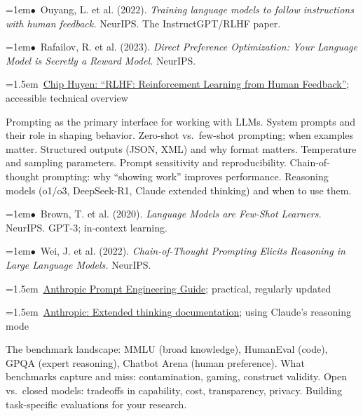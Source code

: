 \documentclass[11pt, a4paper]{article}
\newcommand{\topichead}[1]{%
  \vspace{0.8em}{\large\sffamily\bfseries\textcolor{accent}{#1}}\par\vspace{0.3em}
}
\newcommand{\seclabel}[1]{%
  \vspace{0.5em}{\normalsize\sffamily\bfseries\textcolor{accent}{#1}}\par\vspace{0.2em}
}
\newcommand{\refpaper}[1]{%
  \par\hangindent=1em\hangafter=1\noindent\textcolor{accent}{\small$\bullet$}~{\small #1}\par
}
\newcommand{\resource}[1]{%
  \par\hangindent=1.5em\hangafter=1\noindent\hspace{0.5em}{\small\textcolor{accent}{\guilsinglright}}~{\small #1}\par
}
\begin{document}
\seclabel{Core Readings}

\refpaper{Ouyang, L. et al. (2022). \textit{Training language models to follow instructions with human feedback.} NeurIPS. The InstructGPT/RLHF paper.}

\refpaper{Rafailov, R. et al. (2023). \textit{Direct Preference Optimization: Your Language Model is Secretly a Reward Model.} NeurIPS.}

\seclabel{Further Resources}

\resource{\href{https://huyenchip.com/2023/05/02/rlhf.html}{Chip Huyen: ``RLHF: Reinforcement Learning from Human Feedback''}; accessible technical overview}

\vspace{1em}

\topichead{Prompting \& Reasoning}

\seclabel{Core Concepts}

Prompting as the primary interface for working with LLMs. System prompts and their role in shaping behavior. Zero-shot vs.\ few-shot prompting; when examples matter. Structured outputs (JSON, XML) and why format matters. Temperature and sampling parameters. Prompt sensitivity and reproducibility. Chain-of-thought prompting: why ``showing work'' improves performance. Reasoning models (o1/o3, DeepSeek-R1, Claude extended thinking) and when to use them.

\seclabel{Core Readings}

\refpaper{Brown, T. et al. (2020). \textit{Language Models are Few-Shot Learners.} NeurIPS. GPT-3; in-context learning.}

\refpaper{Wei, J. et al. (2022). \textit{Chain-of-Thought Prompting Elicits Reasoning in Large Language Models.} NeurIPS.}

\seclabel{Further Resources}

\resource{\href{https://docs.anthropic.com/en/docs/build-with-claude/prompt-engineering/overview}{Anthropic Prompt Engineering Guide}; practical, regularly updated}

\resource{\href{https://docs.anthropic.com/en/docs/build-with-claude/extended-thinking}{Anthropic: Extended thinking documentation}; using Claude's reasoning mode}

\vspace{1em}

\topichead{Evaluating \& Choosing Models}

\seclabel{Core Concepts}

The benchmark landscape: MMLU (broad knowledge), HumanEval (code), GPQA (expert reasoning), Chatbot Arena (human preference). What benchmarks capture and miss: contamination, gaming, construct validity. Open vs.\ closed models: tradeoffs in capability, cost, transparency, privacy. Building task-specific evaluations for your research.
\end{document}
